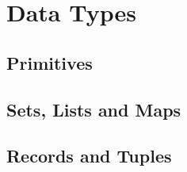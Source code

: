 \newpage
\section{Data Types}

\subsection{Primitives}

\subsection{Sets, Lists and Maps}

\subsection{Records and Tuples}
